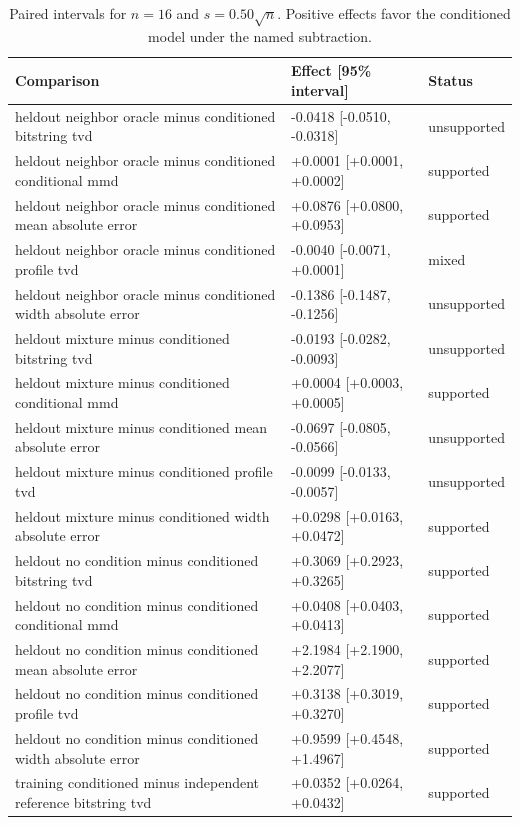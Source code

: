 \begin{table}[p]
\centering
\scriptsize
\setlength{\tabcolsep}{4pt}
\caption{Paired intervals for $n=16$ and $s=0.50\sqrt n$. Positive effects favor the conditioned model under the named subtraction.}
\label{tab:all-intervals-n16-w0.50}
\begin{tabular}{@{}p{}p{}p{}@{}}
\toprule
Comparison & Effect [95\% interval] & Status\\
\midrule
heldout neighbor oracle minus conditioned bitstring tvd & -0.0418 [-0.0510, -0.0318] & unsupported \\
heldout neighbor oracle minus conditioned conditional mmd & +0.0001 [+0.0001, +0.0002] & supported \\
heldout neighbor oracle minus conditioned mean absolute error & +0.0876 [+0.0800, +0.0953] & supported \\
heldout neighbor oracle minus conditioned profile tvd & -0.0040 [-0.0071, +0.0001] & mixed \\
heldout neighbor oracle minus conditioned width absolute error & -0.1386 [-0.1487, -0.1256] & unsupported \\
heldout mixture minus conditioned bitstring tvd & -0.0193 [-0.0282, -0.0093] & unsupported \\
heldout mixture minus conditioned conditional mmd & +0.0004 [+0.0003, +0.0005] & supported \\
heldout mixture minus conditioned mean absolute error & -0.0697 [-0.0805, -0.0566] & unsupported \\
heldout mixture minus conditioned profile tvd & -0.0099 [-0.0133, -0.0057] & unsupported \\
heldout mixture minus conditioned width absolute error & +0.0298 [+0.0163, +0.0472] & supported \\
heldout no condition minus conditioned bitstring tvd & +0.3069 [+0.2923, +0.3265] & supported \\
heldout no condition minus conditioned conditional mmd & +0.0408 [+0.0403, +0.0413] & supported \\
heldout no condition minus conditioned mean absolute error & +2.1984 [+2.1900, +2.2077] & supported \\
heldout no condition minus conditioned profile tvd & +0.3138 [+0.3019, +0.3270] & supported \\
heldout no condition minus conditioned width absolute error & +0.9599 [+0.4548, +1.4967] & supported \\
training conditioned minus independent reference bitstring tvd & +0.0352 [+0.0264, +0.0432] & supported \\

\end{tabular}
\end{table}
